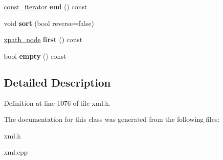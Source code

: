 \begin{DoxyCompactItemize}
\item 
\hypertarget{classphys_1_1xml_1_1xpath__node__set_ae22174a98bc75f9fc6af34d1ea4a00da}{
\hyperlink{classphys_1_1xml_1_1xpath__node}{const\_\-iterator} {\bfseries end} () const }
\label{d0/d0a/classphys_1_1xml_1_1xpath__node__set_ae22174a98bc75f9fc6af34d1ea4a00da}

\item 
\hypertarget{classphys_1_1xml_1_1xpath__node__set_ae22d5513bded2cd5b1643e8ac9eb1324}{
void {\bfseries sort} (bool reverse=false)}
\label{d0/d0a/classphys_1_1xml_1_1xpath__node__set_ae22d5513bded2cd5b1643e8ac9eb1324}

\item 
\hypertarget{classphys_1_1xml_1_1xpath__node__set_acb36e645b807dffb3f0a108ba0ea9c47}{
\hyperlink{classphys_1_1xml_1_1xpath__node}{xpath\_\-node} {\bfseries first} () const }
\label{d0/d0a/classphys_1_1xml_1_1xpath__node__set_acb36e645b807dffb3f0a108ba0ea9c47}

\item 
\hypertarget{classphys_1_1xml_1_1xpath__node__set_ae92c5f7b4876c866f1ea8185745e9112}{
bool {\bfseries empty} () const }
\label{d0/d0a/classphys_1_1xml_1_1xpath__node__set_ae92c5f7b4876c866f1ea8185745e9112}

\end{DoxyCompactItemize}


\subsection{Detailed Description}


Definition at line 1076 of file xml.h.



The documentation for this class was generated from the following files:\begin{DoxyCompactItemize}
\item 
xml.h\item 
xml.cpp\end{DoxyCompactItemize}
